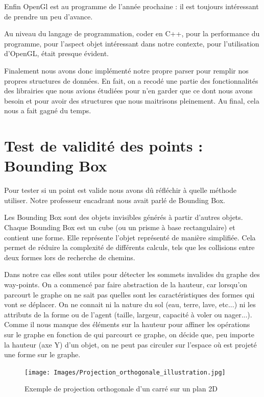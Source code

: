 \documentclass[a4paper,12pt]{report}
\begin{document}
Enfin OpenGl est au programme de l'année prochaine : il est toujours intéressant de prendre un peu d'avance. 

Au niveau du langage de programmation, coder en C++, pour la performance du programme, pour l'aspect objet intéressant dans notre contexte, pour l'utilisation d'OpenGL, était presque évident.

Finalement nous avons donc implémenté notre propre parser pour remplir nos propres structures de données. En fait, on a recodé une partie des fonctionnalités des librairies que nous avions étudiées pour n'en garder que ce dont nous avons besoin et pour avoir des structures que nous maitrisons pleinement. Au final, cela nous a fait gagné du temps.

\section{Test de validité des points : Bounding Box}

Pour tester si un point est valide nous avons dû réfléchir à quelle méthode utiliser. Notre professeur encadrant nous avait parlé de Bounding Box.

Les Bounding Box sont des objets invisibles générés à partir d'autres objets. Chaque Bounding Box est un cube (ou un prisme à base rectangulaire) et contient une forme. Elle représente l'objet représenté de manière simplifiée. Cela permet de réduire la complexité de différents calculs, tels que les collisions entre deux formes lors de recherche de chemins.

Dans notre cas elles sont utiles pour détecter les sommets invalides du graphe des way-points. On a commencé par faire abstraction de la hauteur, car lorsqu'on parcourt le graphe on ne sait pas quelles sont les caractéristiques des formes qui vont se déplacer. On ne connait ni la nature du sol (eau, terre, lave, etc...) ni les attributs de la forme ou de l'agent (taille, largeur, capacité à voler ou nager...). Comme il nous manque des éléments sur la hauteur pour affiner les opérations sur le graphe en fonction de qui parcourt ce graphe, on décide que, peu importe la hauteur (axe Y) d'un objet, on ne peut pas circuler sur l'espace où est projeté une forme sur le graphe. 

\begin{figure}[!ht]
\centering
\texttt{[image: Images/Projection\_orthogonale\_illustration.jpg]}
\caption{Exemple de projection orthogonale d'un carré sur un plan 2D}
\end{figure}
\vspace{0.5cm}
\end{document}

